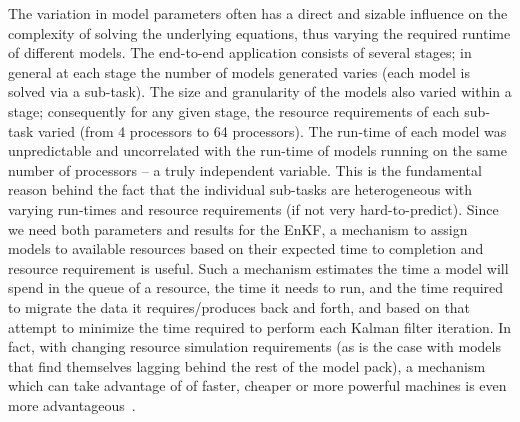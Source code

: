 \documentclass{llncs}
\begin{document}
The variation in model parameters often has a direct and sizable
influence on the complexity of solving the underlying equations, thus
varying the required runtime of different models.  The end-to-end
application consists of several stages; in general at each stage the
number of models generated varies (each model is solved via a
sub-task). The size and granularity of the models also varied within a
stage; consequently for any given stage, the resource requirements of
each sub-task varied (from 4 processors to 64 processors). The
run-time of each model was unpredictable and uncorrelated with the
run-time of models running on the same number of processors – a truly
independent variable.  This is the fundamental reason behind the fact
that the individual sub-tasks are heterogeneous with varying run-times
and resource requirements (if not very hard-to-predict).  Since we
need both parameters and results for the EnKF, a mechanism to assign
models to available resources based on their expected time to
completion and resource requirement is useful.  Such a mechanism
estimates the time a model will spend in the queue of a resource, the
time it needs to run, and the time required to migrate the data it
requires/produces back and forth, and based on that attempt to
minimize the time required to perform each Kalman filter iteration.
In fact, with changing resource simulation requirements (as is the
case with models that find themselves lagging behind the rest of the
model pack), a mechanism which can take advantage of of faster,
cheaper or more powerful machines is even more
advantageous~\cite{escience07}.
\end{document}
